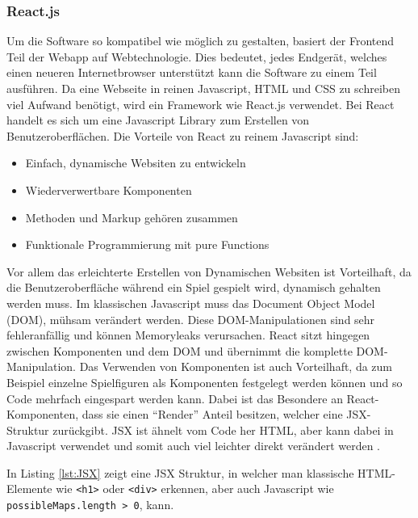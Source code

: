 \documentclass[12pt,a4paper,bibliography=totocnumbered,listof=totocnumbered]{article}
\begin{document}
\subsubsection{React.js}
Um die Software so kompatibel wie möglich zu gestalten, basiert der Frontend Teil der Webapp auf Webtechnologie. Dies bedeutet, jedes Endgerät, welches einen neueren 
Internetbrowser unterstützt kann die Software zu einem Teil ausführen. Da eine Webseite in reinen Javascript, HTML und CSS zu schreiben viel Aufwand benötigt, 
wird ein Framework wie React.js verwendet. Bei React handelt es sich um eine Javascript Library zum Erstellen von Benutzeroberflächen.
Die Vorteile von React zu reinem Javascript sind:
\begin{itemize}
    \item Einfach, dynamische Websiten zu entwickeln
    \item Wiederverwertbare Komponenten
    \item Methoden und Markup gehören zusammen
    \item Funktionale Programmierung mit pure Functions
\end{itemize}
Vor allem das erleichterte Erstellen von Dynamischen Websiten ist Vorteilhaft, da die Benutzeroberfläche während ein Spiel gespielt wird, dynamisch gehalten werden muss.
Im klassischen Javascript muss das Document Object Model (DOM), mühsam verändert werden. Diese DOM-Manipulationen sind sehr fehleranfällig und können Memoryleaks
verursachen. React sitzt hingegen zwischen Komponenten und dem DOM und übernimmt die komplette DOM-Manipulation.
Das Verwenden von Komponenten ist auch Vorteilhaft, da zum Beispiel einzelne Spielfiguren als Komponenten festgelegt werden können 
und so Code mehrfach eingespart werden kann. 
Dabei ist das Besondere an React-Komponenten, dass sie einen ``Render'' Anteil besitzen, welcher eine JSX-Struktur zurückgibt. 
JSX ist ähnelt vom Code her HTML, aber kann dabei in Javascript verwendet und somit auch viel leichter direkt verändert werden \cite{React.js}.

\vspace{1em}


In Listing \ref{lst:JSX} zeigt eine JSX Struktur, in welcher man klassische HTML-Elemente wie \texttt{<h1>} oder \texttt{<div>} erkennen, aber auch Javascript wie 
\texttt{possibleMaps.length > 0}, kann.
\end{document}
